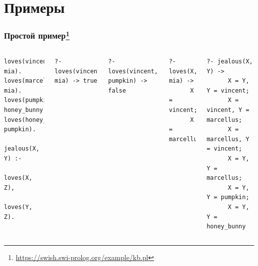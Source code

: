 \documentclass{../../slides-style}
\begin{document}
\section{Примеры}

    \begin{frame}[fragile]
        \frametitle{Простой пример\footnote{\href{https://swish.swi-prolog.org/example/kb.pl}{https://swish.swi-prolog.org/example/kb.pl}}}
        \begin{columns}
            \begin{verbatim}
loves(vincent, mia).
loves(marcellus, mia).
loves(pumpkin, honey_bunny).
loves(honey_bunny, pumpkin).

jealous(X, Y) :-
    loves(X, Z),
    loves(Y, Z).
            \end{verbatim}
            \pause
            \vspace{2mm}
            \begin{verbatim}
?- loves(vincent, mia) -> true
            \end{verbatim}
            \pause
            \vspace{2mm}
            \begin{verbatim}
?- loves(vincent, pumpkin) -> false
            \end{verbatim}
            \pause
            \vspace{2mm}
            \begin{verbatim}
?- loves(X, mia) ->
      X = vincent;
      X = marcellus
            \end{verbatim}
            \pause
            \vspace{2mm}
            \begin{verbatim}
?- jealous(X, Y) ->
      X = Y, Y = vincent;
      X = vincent, Y = marcellus;
      X = marcellus, Y = vincent;
      X = Y, Y = marcellus;
      X = Y, Y = pumpkin;
      X = Y, Y = honey_bunny 
            \end{verbatim}
        \end{columns}
    \end{frame}
\end{document}
